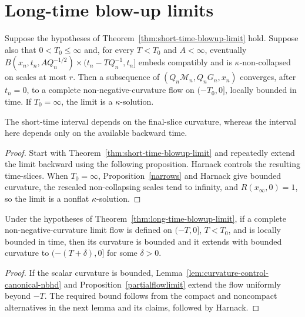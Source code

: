 \section{Long-time blow-up limits}

\begin{theorem}
\label{thm:long-time-blowup-limit}
\label{kaplimit}

Suppose the hypotheses of Theorem~\ref{thm:short-time-blowup-limit} hold.
Suppose also that $0<T_0\le\infty$ and, for every $T<T_0$ and $A<\infty$,
eventually $B(x_n,t_n,AQ_n^{-1/2})\times(t_n-TQ_n^{-1},t_n]$ embeds compatibly
and is $\kappa$-non-collapsed on scales at most $r$. Then a subsequence of
$(Q_n{\mathcal M}_n,Q_nG_n,x_n)$ converges, after $t_n=0$, to a complete
non-negative-curvature flow on $(-T_0,0]$, locally bounded in time. If
$T_0=\infty$, the limit is a $\kappa$-solution.
\end{theorem}
\begin{remark}
\label{rem:comparison-short-and-long-time-limits}

The short-time interval depends on the final-slice curvature, whereas the
interval here depends only on the available backward time.
\end{remark}
\begin{proof}
\sketch Start with Theorem~\ref{thm:short-time-blowup-limit} and repeatedly
extend the limit backward using the following proposition. Harnack controls
the resulting time-slices. When $T_0=\infty$, Proposition~\ref{narrows} and
Harnack give bounded curvature, the rescaled non-collapsing scales tend to
infinity, and $R(x_\infty,0)=1$, so the limit is a nonflat $\kappa$-solution.
\end{proof}

\begin{proposition}
\label{prop:extend-limit-flow-backward}
\label{maxT}

Under the hypotheses of Theorem~\ref{thm:long-time-blowup-limit}, if a complete
non-negative-curvature limit flow is defined on $(-T,0]$, $T<T_0$, and is
locally bounded in time, then its curvature is bounded and it extends with
bounded curvature to $(-(T+\delta),0]$ for some $\delta>0$.
\end{proposition}
\begin{proof}
\sketch If the scalar curvature is bounded, Lemma~\ref{lem:curvature-control-canonical-nbhd}
and Proposition~\ref{partialflowlimit} extend the flow uniformly beyond $-T$.
The required bound follows from the compact and noncompact alternatives in
the next lemma and its claims, followed by Harnack.
\end{proof}

